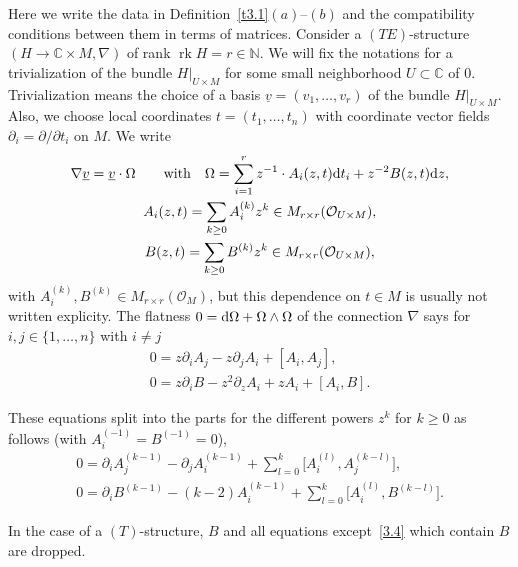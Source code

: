 \documentclass[10pt,a4paper]{amsart}
\numberwithin{equation}{section}
\numberwithin{figure}{section}
\newcommand{\N}{{\mathbb N}}
\newcommand{\C}{{\mathbb C}}
\newcommand{\OO}{{\mathcal O}}
\newcommand{\ddd}{{\rm d}}
\newcommand{\uuuu}{\underline}
\newcommand{\paa}{\partial}
\newcommand{\nnn}{\nabla}
\DeclareMathOperator{\rk}{rk}
\begin{document}
\begin{Remark}\label{t3.2}
Here we write the data in Definition~\ref{t3.1}$(a)$--$(b)$
and the compatibility conditions between them in terms
of matrices.
Consider a $(TE)$-structure $(H\to\C\times M,\nnn)$
of rank $\rk H=r\in\N$.
We will fix the notations for a trivialization
of the bundle $H|_{U\times M}$ for some small neighborhood
$U\subset \C$ of 0. Trivialization means the choice of a
basis $\uuuu{v}=(v_1,\dots ,v_r)$ of the bundle $H|_{U\times M}$.
Also, we choose local coordinates $t=(t_1,\dots ,t_n)$
with coordinate vector fields $\paa_i=\paa/\paa t_i$ on $M$.
We write\vspace{-1ex}
\begin{gather}
\nnn\uuuu{v}=\uuuu{v}\cdot\Omega\qquad\text{with}\quad
\Omega = \sum_{i=1}^r z^{-1}\cdot A_i(z,t)\ddd t_i +z^{-2}B(z,t)\ddd z,
\label{3.4}
\\
A_i(z,t)= \sum_{k\geq 0}A_i^{(k)}z^k\in M_{r\times r}(\OO_{U\times M}),
\label{3.5}
\\
B(z,t)=\sum_{k\geq 0} B^{(k)}z^k\in M_{r\times r}(\OO_{U\times M}),
\label{3.6}
\end{gather}
with $A_i^{(k)},B^{(k)}\in M_{r\times r}(\OO_M)$,
but this dependence on $t\in M$ is usually not written
explicity.
The flatness $0=\ddd \Omega+\Omega\land\Omega$ of the connection
$\nnn$ says for $i,j\in\{1,\dots ,n\}$ with $i\neq j${\samepage
\begin{gather}\label{3.7}
0= z\paa_iA_j-z\paa_jA_i+[A_i,A_j],\\
0= z\paa_i B-z^2\paa_z A_i + zA_i + [A_i,B].
\label{3.8}
\end{gather}}

\pagebreak

\noindent
These equations split into the parts for the different powers
$z^k$ for $k\geq 0$ as follows \big(with $A_i^{(-1)}=B^{(-1)}=0$\big),
\begin{gather}\label{3.9}
0= \paa_iA_j^{(k-1)}-\paa_jA_i^{(k-1)}+\sum_{l=0}^k\big[A_i^{(l)},A_j^{(k-l)}\big],
\\
0= \paa_i B^{(k-1)}-(k-2)A_i^{(k-1)}+\sum_{l=0}^k\big[A_i^{(l)},B^{(k-l)}\big].
\label{3.10}
\end{gather}

In the case of a $(T)$-structure, $B$ and all
equations except~\eqref{3.4} which contain $B$ are dropped.


\end{Remark}
\end{document}
